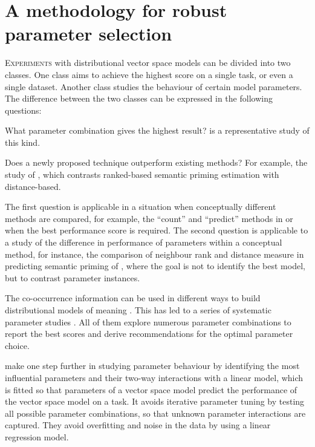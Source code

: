 \chapter{A methodology for robust parameter selection}
\label{sec:methodology}

\lettrine[lines=5,loversize=0.25]{E}{xperiments} with distributional vector space models can be divided into two classes. One class aims to achieve the highest score on a single task, or even a single dataset. Another class studies the behaviour of certain model parameters. The difference between the two classes can be expressed in the following questions:

\begin{compactitem}
\item What parameter combination gives the highest result?  is a representative study of this kind.
\item Does a newly proposed technique outperform existing methods? For example, the study of , which contrasts ranked-based semantic priming estimation with distance-based.
\end{compactitem}

The first question is applicable in a situation when conceptually different methods are compared, for example, the ``count'' and  ``predict'' methods in  or when the best performance score is required. The second question is applicable to a study of the difference in performance of parameters within a conceptual method, for instance, the comparison of neighbour rank and distance measure in predicting semantic priming of , where the goal is not to identify the best model, but to contrast parameter instances.

The co-occurrence information can be used in different ways to build distributional models of meaning \cite{Turney:2010:FMV:1861751.1861756}. This has led to a series of  systematic parameter studies \cite{Bullinaria2007,BullinariaLevy2012,kiela-clark:2014:CVSC,lapesa2014large,TACL570,baroni-dinu-kruszewski:2014:P14-1}. All of them explore numerous parameter combinations to report the best scores and derive recommendations for the optimal parameter choice.

 make one step further in studying parameter behaviour by identifying the most influential parameters and their two-way interactions with a linear model, which is fitted so that parameters of a vector space model predict the performance of the vector space model on a task. It avoids iterative parameter tuning by testing all possible parameter combinations, so that unknown parameter interactions are captured. They avoid overfitting\footnotemark{} and noise in the data by using a linear regression model.

